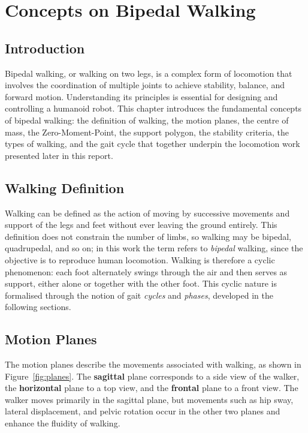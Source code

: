 \chapter{Concepts on Bipedal Walking}
\label{chap:walking}

\section{Introduction}
Bipedal walking, or walking on two legs, is a complex form of locomotion
that involves the coordination of multiple joints to achieve stability,
balance, and forward motion. Understanding its principles is essential
for designing and controlling a humanoid robot. This chapter introduces
the fundamental concepts of bipedal walking: the definition of walking,
the motion planes, the centre of mass, the Zero-Moment-Point, the
support polygon, the stability criteria, the types of walking, and the
gait cycle that together underpin the locomotion work presented later in
this report.

\section{Walking Definition}
Walking can be defined as the action of moving by successive movements
and support of the legs and feet without ever leaving the ground
entirely. This definition does not constrain the number of limbs, so
walking may be bipedal, quadrupedal, and so on; in this work the term
refers to \emph{bipedal} walking, since the objective is to reproduce
human locomotion. Walking is therefore a cyclic phenomenon: each foot
alternately swings through the air and then serves as support, either
alone or together with the other foot. This cyclic nature is formalised
through the notion of gait \emph{cycles} and \emph{phases}, developed in
the following sections.

\section{Motion Planes}
The motion planes describe the movements associated with walking, as
shown in Figure~\ref{fig:planes}. The \textbf{sagittal} plane
corresponds to a side view of the walker, the \textbf{horizontal} plane
to a top view, and the \textbf{frontal} plane to a front view. The
walker moves primarily in the sagittal plane, but movements such as hip
sway, lateral displacement, and pelvic rotation occur in the other two
planes and enhance the fluidity of walking.

